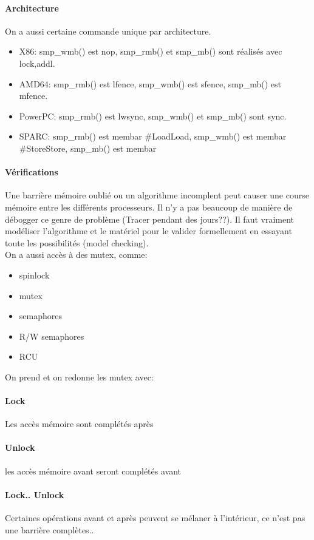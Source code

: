 \documentclass[oneside]{book}
\begin{document}
\paragraph{Architecture}
On a aussi certaine commande unique par architecture.
\begin{itemize}
\item X86: smp\_wmb() est nop, smp\_rmb() et smp\_mb() sont
réalisés avec lock,addl.
\item AMD64: smp\_rmb() est lfence, smp\_wmb() est sfence,
smp\_mb() est mfence.
\item PowerPC: smp\_rmb() est lwsync, smp\_wmb() et
smp\_mb() sont sync.
\item SPARC: smp\_rmb() est membar \#LoadLoad, smp\_wmb()
est membar \#StoreStore, smp\_mb() est membar
\end{itemize}

\paragraph{Vérifications}
Une barrière mémoire oublié ou un algorithme incomplent peut causer une course mémoire entre les différents processeurs. Il n'y a pas beaucoup de manière de débogger ce genre de problème (Tracer pendant des jours??). Il faut vraiment modéliser l'algorithme et le matériel pour le valider formellement en essayant toute les possibilités (model checking).\\

On a aussi accès à des mutex, comme:
\begin{itemize}
\item spinlock
\item mutex
\item semaphores
\item R/W semaphores
\item RCU
\end{itemize}
On prend et on redonne les mutex avec:\\

\paragraph{Lock} Les accès mémoire sont complétés après
\paragraph{Unlock} les accès mémoire avant seront complétés avant
\paragraph{Lock.. Unlock} Certaines opérations avant et après peuvent se mélaner à l'intérieur, ce n'est pas une barrière complètes..
\end{document}
